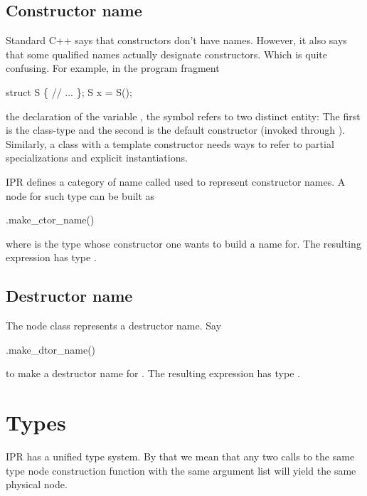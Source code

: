 \documentclass[a4paper,12pt]{article}
\begin{document}
\subsection{Constructor name}
\label{sec:name.ctor-name}

Standard C++ says that constructors don't have names.  However, it also says
that some qualified names actually designate constructors.  Which is quite
confusing. For example, in the program fragment
\begin{Program}
  struct S \{
     // ...
  \};
  S x = S();
\end{Program}
the declaration of the variable , the symbol  refers to two
distinct entity: The first is the class-type and the second is the default
constructor (invoked through ).  
Similarly, a class with a template constructor needs ways to refer to partial
specializations and explicit instantiations.  

IPR defines a category of name called  used to represent
constructor names.  A node for such type can be built as
\begin{Program}
  .make_ctor_name()
\end{Program}
where  is the type whose constructor one wants to build a name for.
The resulting expression has type .  

\subsection{Destructor name}
\label{sec:name.dtor-name}

The node class  represents a destructor name.  Say
\begin{Program}
  .make_dtor_name()
\end{Program}
to make a destructor name for .  The resulting expression has type
.


\section{Types}
\label{sec:types}

IPR has a unified type system.  By that we mean that any two
calls to the same type node construction function with the same argument list
will yield the same physical node.
\end{document}
